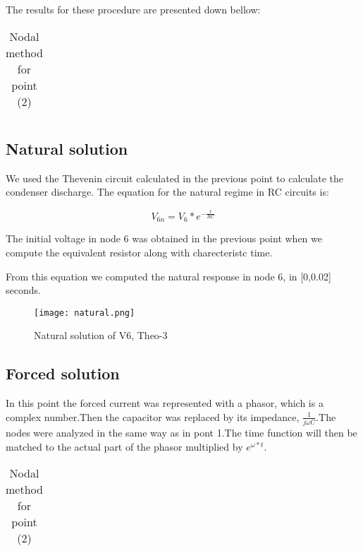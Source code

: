 The results for these procedure are presented down bellow: 

\vspace{0.2cm}
\FloatBarrier
\begin{table}[h]
  \centering
  \begin{tabular}{|c|c|c|c|c|c|c|}
	\hline
    
	\hline
  \end{tabular}
  \caption{Nodal method for point (2)}
  \label{tab:nodal}
\end{table}
\FloatBarrier 
  

\subsection{Natural solution} 

We used the Thevenin circuit calculated in the previous point to calculate the condenser discharge. The equation for the natural regime in RC circuits is: 

\begin{equation}
  V_{6n}=V_6*e^{-\frac{t}{RC}}
  \label{eq:kvl}
\end{equation}   

The initial voltage in node 6 was obtained in the previous point when we compute the equivalent resistor along with charecteristc time. 

From this equation we computed the natural response in node 6, in [0,0.02] seconds.  
\FloatBarrier
\begin{figure}
  \texttt{[image: natural.png]}
  \caption{Natural solution of V6, Theo-3}
  \label{fig:natural}
\end{figure}
\FloatBarrier

\subsection{Forced solution} 

In this point the forced current was represented with a phasor, which is a complex number.Then the capacitor was replaced by its impedance, $\frac{1}{j\omega C}$.The nodes were analyzed in the same way as in pont 1.The time function will then be matched to the actual part of the phasor multiplied by $e^{\omega*t}$. 


\vspace{0.2cm}
\FloatBarrier
\begin{table}[h]
  \centering
  \begin{tabular}{|c|c|}
   \hline
    
	\hline
  \end{tabular}
  \caption{Nodal method for point (2)}
  \label{tab:nodal}
\end{table}
\FloatBarrier 






